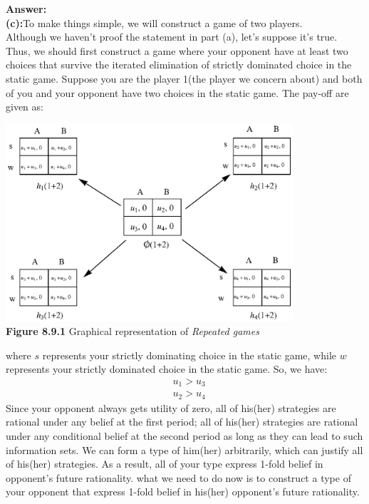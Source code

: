 \documentclass{article}
\begin{document}
\begin{description}
    \newpage
    \item[8.9 Repeated games:]{\bf Answer:}\\
    {\bf (c):}To make things simple, we will construct a game of two players.\\
    Although we haven't proof the statement in part (a), let's suppose it's true. Thus, we should first construct a game where your opponent have at least two choices that survive the iterated elimination of strictly dominated choice in the static game. Suppose you are the player 1(the player we concern about) and both of you and your opponent have two choices in the static game. The pay-off are given as:
    \begin{center}
                    \includegraphics[angle=0, width=0.8\textwidth]{ECON3160A4P3}\\
                    {\bf Figure 8.9.1} Graphical representation of {\it Repeated games}
    \end{center}
    where $s$ represents your strictly dominating choice in the static game, while $w$ represents your strictly dominated choice in the static game. So, we have:
    \begin{align}
      &u_1>u_3\\
      &u_2>u_4
    \end{align}
    Since your opponent always gets utility of zero, all of his(her) strategies are rational under any belief at the first period; all of his(her) strategies are rational under any conditional belief at the second period as long as they can lead to such information sets. We can form a type of him(her) arbitrarily, which can justify all of his(her) strategies. As a result, all of your type express 1-fold belief in opponent's future rationality. what we need to do now is to construct a type of your opponent that express 1-fold belief in his(her) opponent's future rationality.\\

\end{description}
\end{document}
